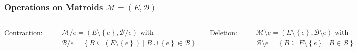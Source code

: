 \documentclass{beamer}
\newcommand{\tupel}[1]{\left(#1\right)}
\newcommand{\set}[1]{\left\{#1\right\}}
\begin{document}
\begin{frame}
  \frametitle{Operations on Matroids $\mathcal{M} = \tupel{E, \mathcal{B}}$}
  \begin{columns}
    \begin{center}
      Contraction:
    \end{center}
    \vspace{-0.6cm}
    \begin{align*}
      &\mathcal{M}/e = \tupel{E\setminus\set{e}, \mathcal{B}/e}\text{ with}\\
      &\mathcal{B}/e = \set{B\subseteq (E\setminus\set{e})\middle| B\cup\set{e}\in\mathcal{B}}
    \end{align*}
    \column<4->{0.5\textwidth}
    \begin{center}
      Deletion:
    \end{center}
    \vspace{-0.6cm}
    \begin{align*}
      &\mathcal{M}\setminus e = \tupel{E\setminus\set{e},\mathcal{B}\setminus e}\text{ with}\\
      &\mathcal{B}\setminus e = \set{B\subseteq E\setminus\set{e}\middle|B\in\mathcal{B}}
    \end{align*}
  \end{columns}
  \begin{center}
  \end{center}
\end{frame}
\end{document}
